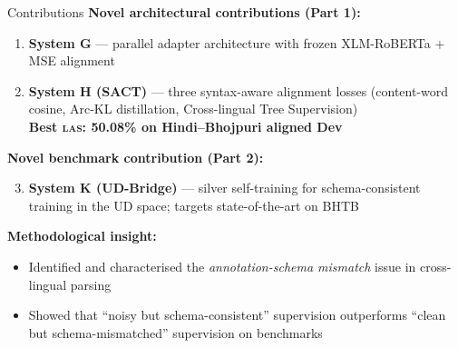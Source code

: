 \documentclass[aspectratio=169,10pt]{beamer}
\newcommand{\bho}{Bhojpuri}
\newcommand{\hi}{Hindi}
\newcommand{\xlmr}{XLM-RoBERTa}
\newcommand{\las}{\textsc{las}}
\begin{document}
\begin{frame}{Contributions}
\textbf{Novel architectural contributions (Part 1):}
\begin{enumerate}
  \item \textbf{System G} --- parallel adapter architecture with frozen \xlmr{} + MSE alignment
  \item \textbf{System H (SACT)} --- three syntax-aware alignment losses
        (content-word cosine, Arc-KL distillation, Cross-lingual Tree Supervision)\\
        \textbf{Best \las{}: 50.08\% on \hi{}--\bho{} aligned Dev}
\end{enumerate}

\vspace{0.4cm}
\textbf{Novel benchmark contribution (Part 2):}
\begin{enumerate}\setcounter{enumi}{2}
  \item \textbf{System K (UD-Bridge)} --- silver self-training for schema-consistent
        training in the UD space; targets state-of-the-art on BHTB
\end{enumerate}

\vspace{0.4cm}
\textbf{Methodological insight:}
\begin{itemize}
  \item Identified and characterised the \emph{annotation-schema mismatch} issue in cross-lingual parsing
  \item Showed that ``noisy but schema-consistent'' supervision outperforms
        ``clean but schema-mismatched'' supervision on benchmarks
\end{itemize}
\end{frame}
\end{document}
